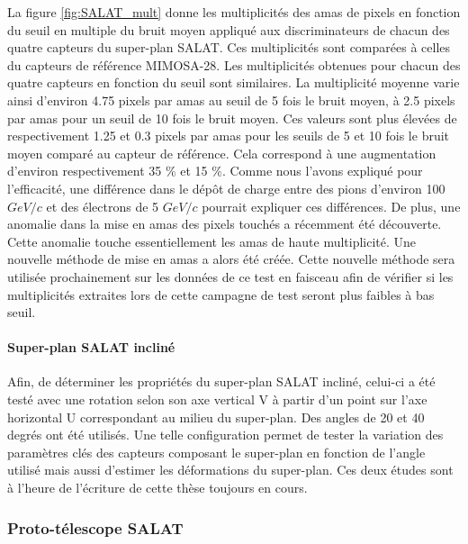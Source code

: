    La figure \ref{fig:SALAT_mult} donne les multiplicit\'es des amas de pixels en fonction du seuil en multiple du bruit moyen appliqu\'e aux discriminateurs de chacun des quatre capteurs du super-plan SALAT. Ces multiplicit\'es sont compar\'ees \`a celles du capteurs de r\'ef\'erence MIMOSA-28. Les multiplicit\'es obtenues pour chacun des quatre capteurs en fonction du seuil sont similaires. La multiplicit\'e moyenne varie ainsi d'environ 4.75 pixels par amas au seuil de 5 fois le bruit moyen, \`a 2.5 pixels par amas pour un seuil de 10 fois le bruit moyen. Ces valeurs sont plus \'elev\'ees de respectivement 1.25 et 0.3 pixels par amas pour les seuils de 5 et 10 fois le bruit moyen compar\'e au capteur de r\'ef\'erence. Cela correspond \`a une augmentation d'environ respectivement 35 $\%$ et 15 $\%$. Comme nous l'avons expliqu\'e pour l'efficacit\'e, une diff\'erence dans le d\'epôt de charge entre des pions d'environ 100 $GeV/c$ et des \'electrons de 5 $GeV/c$ pourrait expliquer ces diff\'erences. De plus, une anomalie dans la mise en amas des pixels touch\'es a r\'ecemment \'et\'e d\'ecouverte. Cette anomalie touche essentiellement les amas de haute multiplicit\'e. Une nouvelle m\'ethode de mise en amas a alors \'et\'e cr\'eée. Cette nouvelle m\'ethode sera utilis\'ee prochainement sur les donn\'ees de ce test en faisceau afin de v\'erifier si les multiplicit\'es extraites lors de cette campagne de test seront plus faibles \`a bas seuil.
   
   \FloatBarrier
   
  \paragraph{Super-plan SALAT inclin\'e}
  
  Afin, de d\'eterminer les propri\'et\'es du super-plan SALAT inclin\'e, celui-ci a \'et\'e test\'e avec une rotation selon son axe vertical V \`a partir d'un point sur l'axe horizontal U correspondant au milieu du super-plan. Des angles de 20 et 40 degr\'es ont \'et\'e utilis\'es. Une telle configuration permet de tester la variation des param\`etres cl\'es des capteurs composant le super-plan en fonction de l'angle utilis\'e mais aussi d'estimer les d\'eformations du super-plan. Ces deux \'etudes sont \`a l'heure de l'\'ecriture de cette th\`ese toujours en cours.
  
  \subsubsection{Proto-t\'elescope SALAT}
  
